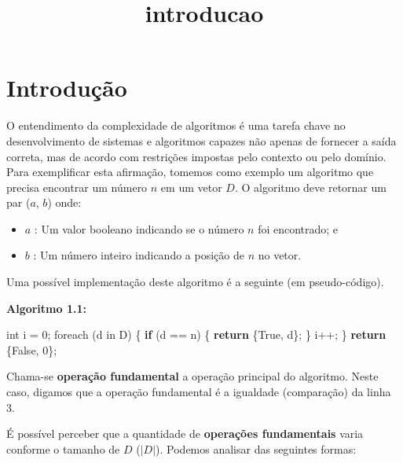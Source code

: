\documentclass{article}
\title{introducao}
\newenvironment{Shaded}{}{}
\newcommand{\KeywordTok}[1]{\textcolor[rgb]{0.00,0.44,0.13}{\textbf{{#1}}}}
\newcommand{\DataTypeTok}[1]{\textcolor[rgb]{0.56,0.13,0.00}{{#1}}}
\newcommand{\DecValTok}[1]{\textcolor[rgb]{0.25,0.63,0.44}{{#1}}}
\newcommand{\FunctionTok}[1]{\textcolor[rgb]{0.02,0.16,0.49}{{#1}}}
\newcommand{\NormalTok}[1]{{#1}}
\begin{document}
    
    
    \maketitle
    
    

    

    \section{Introdução}


    O entendimento da complexidade de algoritmos é uma tarefa chave no
desenvolvimento de sistemas e algoritmos capazes não apenas de fornecer
a saída correta, mas de acordo com restrições impostas pelo contexto ou
pelo domínio. Para exemplificar esta afirmação, tomemos como exemplo um
algoritmo que precisa encontrar um número \(n\) em um vetor \(D\). O
algoritmo deve retornar um par (\(a\), \(b\)) onde:

\begin{itemize}
\itemsep1pt\parskip0pt
\item
  \(a\) : Um valor booleano indicando se o número \(n\) foi encontrado;
  e
\item
  \(b\) : Um número inteiro indicando a posição de \(n\) no vetor.
\end{itemize}

Uma possível implementação deste algoritmo é a seguinte (em
pseudo-código).

\textbf{Algoritmo 1.1:}

    \begin{Shaded}
\begin{Highlighting}[]
\DataTypeTok{int} \NormalTok{i = }\DecValTok{0}\NormalTok{; }
\FunctionTok{foreach} \NormalTok{(d in D) \{}
      \KeywordTok{if} \NormalTok{(d == n) \{}
          \KeywordTok{return} \NormalTok{\{True, d\};}
      \NormalTok{\}}
      \NormalTok{i++;}
\NormalTok{\}}
\KeywordTok{return} \NormalTok{\{False, }\DecValTok{0}\NormalTok{\};}
\end{Highlighting}
\end{Shaded}

    Chama-se \textbf{operação fundamental} a operação principal do
algoritmo. Neste caso, digamos que a operação fundamental é a igualdade
(comparação) da linha 3.

É possível perceber que a quantidade de \textbf{operações fundamentais}
varia conforme o tamanho de \(D\) (\(|D|\)). Podemos analisar das
seguintes formas:
\end{document}
